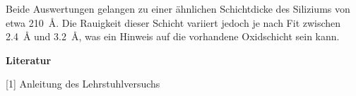 Beide Auswertungen gelangen zu einer ähnlichen Schichtdicke des Siliziums von etwa \SI{210}{\angstrom}.
Die Rauigkeit dieser Schicht variiert jedoch je nach Fit zwischen \SI{2.4}{\angstrom} und \SI{3.2}{\angstrom}, was ein Hinweis auf die vorhandene Oxidschicht sein kann.



\vspace{2cm}
\textbf{Literatur}

\vspace{0.3cm}
[1] Anleitung des Lehrstuhlversuchs





